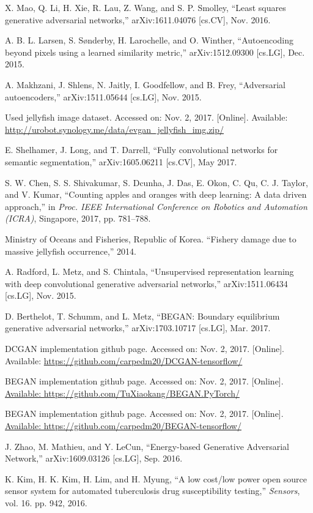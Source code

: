\documentclass{ieeeaccess}
\begin{document}
\begin{thebibliography}{00}
 X. Mao, Q. Li, H. Xie, R. Lau, Z. Wang, and S. P. Smolley, ``Least squares generative adversarial networks,'' arXiv:1611.04076 [cs.CV], Nov. 2016. 

 A. B. L. Larsen, S. S{\o}nderby, H. Larochelle, and O. Winther, ``Autoencoding beyond pixels using a learned similarity metric,'' arXiv:1512.09300 [cs.LG], Dec. 2015. 

 A. Makhzani, J. Shlens, N. Jaitly, I. Goodfellow, and B. Frey, ``Adversarial autoencoders,'' arXiv:1511.05644 [cs.LG], Nov. 2015.

 Used jellyfish image dataset. Accessed on: Nov. 2, 2017. [Online].  Available: \underline{http://urobot.synology.me/data/evgan\_jellyfish\_img.zip/}

 E. Shelhamer, J. Long, and T. Darrell, ``Fully convolutional networks for semantic segmentation,'' arXiv:1605.06211 [cs.CV], May 2017.

 S. W. Chen, S. S. Shivakumar, S. Dcunha, J. Das, E. Okon, C. Qu, C. J. Taylor, and V. Kumar, ``Counting apples and oranges with deep learning: A data driven approach,'' in \textit{Proc. IEEE International Conference on Robotics and Automation (ICRA)}, Singapore, 2017, pp. 781--788.

 Ministry of Oceans and Fisheries, Republic of Korea. ``Fishery damage due to massive jellyfish occurrence,'' 2014.

 A. Radford, L. Metz, and S. Chintala, ``Unsupervised representation learning with deep convolutional generative adversarial networks,'' arXiv:1511.06434 [cs.LG], Nov. 2015.

 D. Berthelot, T. Schumm, and L. Metz, ``BEGAN: Boundary equilibrium generative adversarial networks,'' arXiv:1703.10717 [cs.LG], Mar. 2017.

 DCGAN implementation github page. Accessed on: Nov. 2, 2017. [Online]. Available: \underline{https://github.com/carpedm20/DCGAN-tensorflow/}

 BEGAN implementation github page. Accessed on: Nov. 2, 2017. [Online]. \underline{Available: https://github.com/TuXiaokang/BEGAN.PyTorch/}

 BEGAN implementation github page. Accessed on: Nov. 2, 2017. [Online]. \underline{Available: https://github.com/carpedm20/BEGAN-tensorflow/}

 J. Zhao, M. Mathieu, and Y. LeCun, ``Energy-based Generative Adversarial Network,'' 	arXiv:1609.03126 [cs.LG], Sep. 2016.

 K. Kim, H. K. Kim, H. Lim, and H. Myung, ``A low cost/low power open source sensor system for automated tuberculosis drug susceptibility testing,'' \textit{Sensors}, vol. 16. pp. 942, 2016.

\end{thebibliography}
\end{document}
